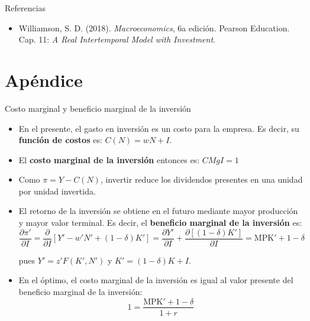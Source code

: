 \documentclass[aspectratio=169,11pt]{beamer}
\begin{document}
\begin{frame}{Referencias}
  \begin{itemize}
    \item Williamson, S. D. (2018). \textit{Macroeconomics}, 6a edición. Pearson Education. Cap. 11: \textit{A Real Intertemporal Model with Investment}.
  \end{itemize}
\end{frame}

\appendix
\section{Apéndice}


\begin{frame}[label=apendice-inversion]{Costo marginal y beneficio marginal de la inversión}
  \footnotesize
  \begin{itemize}
    \item En el presente, el gasto en inversión es un costo para la empresa. Es decir, su \textbf{función de costos} es: $C(N) = wN + I$.
    \item El \textbf{costo marginal de la inversión} entonces es: $CMgI = 1$
    \item Como $\pi = Y - C(N)$, invertir reduce los dividendos presentes en una unidad por unidad invertida.
    \item El retorno de la inversión se obtiene en el futuro mediante mayor producción y mayor valor terminal. Es decir, el \textbf{beneficio marginal de la inversión} es:
    $$
    \frac{\partial \pi'}{ \partial I} = \frac{\partial}{\partial I} \left[Y' - w'N' + (1-\delta)K'\right] 
    = \frac{\partial Y'}{\partial I} + \frac{\partial \left[(1-\delta)K' \right]}{\partial I}
    = \mathrm{MPK'} + 1-\delta
    $$

    pues $Y' = z' F(K',N')$ y $K' = (1-\delta)K + I$.

    \item En el óptimo, el costo marginal de la inversión es igual al valor presente del beneficio marginal de la inversión:
    $$
      1 = \frac{\mathrm{MPK'} + 1-\delta}{1+r}
    $$
  \end{itemize} 

  \hyperlink{reglainversion}{
  }
\end{frame}
\end{document}
